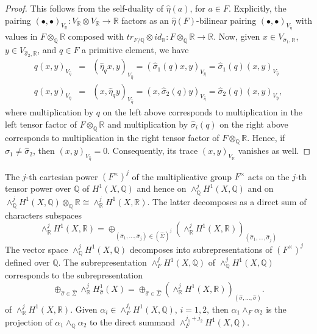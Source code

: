 \documentclass[12pt]{amsart}
\numberwithin{equation}{subsection}
\theoremstyle{plain}
\theoremstyle{definition}
\newcommand{\QQ}{{\mathbb Q}}
\newcommand{\RR}{{\mathbb R}}
\begin{document}
{\begin{proof}
This follows from the self-duality of
 $\hat{\eta}(a)$, for $a\in F$. Explicitly, the pairing $(\bullet,\bullet)_{V_\RR}:V_\RR\otimes V_\RR\rightarrow \RR$  factors as an $\hat{\eta}(F)$-bilinear pairing 
$(\bullet,\bullet)_{V_{\hat{\eta}}}$ with values in $F\otimes_\QQ\RR$ composed with $tr_{F/\QQ}\otimes id_\RR:F\otimes_\QQ\RR\rightarrow \RR$. Now, given $x\in V_{\hat{\sigma}_1,\RR}$, $y\in V_{\hat{\sigma}_2,\RR}$, and $q\in F$ a primitive element,  we have
\begin{eqnarray*}
q(x,y)_{V_{\hat{\eta}}}&=&(\hat{\eta}_q x,y)_{V_{\hat{\eta}}}=(\hat{\sigma}_1(q)x,y)_{V_{\hat{\eta}}}=
\hat{\sigma}_1(q)(x,y)_{V_{\hat{\eta}}}
\\
q(x,y)_{V_{\hat{\eta}}}&=&(x,\hat{\eta}_q y)_{V_{\hat{\eta}}}= (x,\hat{\sigma}_2(q)y)_{V_{\hat{\eta}}}=\hat{\sigma}_2(q)(x,y)_{V_{\hat{\eta}}},
\end{eqnarray*}
where multiplication by $q$ on the left above corresponds to multiplication in the left tensor factor of $F\otimes_\QQ\RR$ and multiplication by 
$\hat{\sigma}_i(q)$ on the right above corresponds to multiplication in the right tensor factor of $F\otimes_\QQ\RR$. Hence, if $\hat{\sigma}_1\neq\hat{\sigma}_2$, then
$(x,y)_{V_{\hat{\eta}}}=0.$ Consequently, its trace $(x,y)_{V_\RR}$ vanishes as well.
\end{proof}


The $j$-th cartesian power $(F^\times)^j$ of the multiplicative group $F^\times$ acts on the $j$-th tensor power over $\QQ$ of $H^1(X,\QQ)$ and hence
on $\wedge^j_\QQ H^1(X,\QQ)$ and on $\wedge^j_\QQ H^1(X,\QQ)\otimes_\QQ\RR\cong\wedge^j_\RR H^1(X,\RR)$.
The latter decomposes as a direct sum of characters subspaces 
\[
\wedge^j_\RR H^1(X,\RR)=
\oplus_{(\hat{\sigma}_1, \dots, \hat{\sigma}_j)\in (\hat{\Sigma})^j}\left(\wedge^j_\RR H^1(X,\RR)\right)_{(\hat{\sigma}_1, \dots, \hat{\sigma}_j)}
\]
The vector space $\wedge^j_\QQ H^1(X,\QQ)$ decomposes into subrepresentations of $(F^\times)^j$ defined over $\QQ$. The subrepresentation $\wedge^j_FH^1(X,\QQ)$ of $\wedge^j_\QQ H^1(X,\QQ)$  corresponds to the subrepresentation
\[
\oplus_{\hat{\sigma}\in\hat{\Sigma}}\wedge^j_\RR H^1_{\hat{\sigma}}(X)= 
\oplus_{\hat{\sigma}\in\hat{\Sigma}}\left(\wedge^j_\RR H^1(X,\RR)\right)_{(\hat{\sigma}, \dots, \hat{\sigma})}.
\]
of $\wedge^j_\RR H^1(X,\RR)$. Given $\alpha_i\in \wedge^{j_i}_F H^1(X,\QQ)$, $i=1,2$, then $\alpha_1\wedge_F\alpha_2$ 
is the projection of $\alpha_1\wedge_\QQ\alpha_2$ to the direct summand $\wedge_F^{j_1+j_2}H^1(X,\QQ)$.

}
\end{document}
